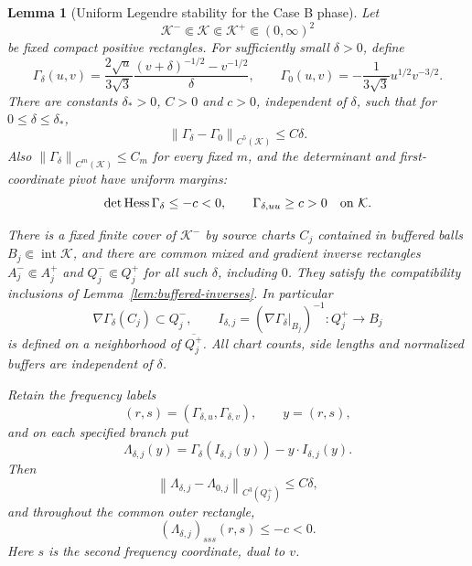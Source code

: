 \documentclass[11pt,a4paper]{article}
\numberwithin{equation}{section}
\newtheorem{lemma}[theorem]{Lemma}
\theoremstyle{remark}
\newcommand{\norm}[1]{\left\lVert #1\right\rVert}
\DeclareMathOperator{\Hess}{Hess}
\begin{document}
\begin{lemma}[Uniform Legendre stability for the Case B phase]
\label{lem:caseB-Legendre-stability}
Let
\[
 \mathcal K^-\Subset\mathcal K\Subset\mathcal K^+
 \Subset(0,\infty)^2
\]
be fixed compact positive rectangles. For sufficiently small $\delta>0$,
define
\begin{equation}\label{eq:caseB-stability-exact}
 \Gamma_\delta(u,v)
 =\frac{2\sqrt u}{3\sqrt3}
   \frac{(v+\delta)^{-1/2}-v^{-1/2}}{\delta},
 \qquad
 \Gamma_0(u,v)=-\frac1{3\sqrt3}u^{1/2}v^{-3/2}.
\end{equation}
There are constants $\delta_*>0$, $C>0$ and $c>0$, independent of
$\delta$, such that for $0\le\delta\le\delta_*$,
\begin{equation}\label{eq:caseB-stability-C5}
 \norm{\Gamma_\delta-\Gamma_0}_{C^5(\mathcal K)}\le C\delta.
\end{equation}
Also $\norm{\Gamma_\delta}_{C^m(\mathcal K)}\le C_m$ for every fixed
$m$, and the determinant and first-coordinate pivot have uniform margins:
\[
 \det\Hess\Gamma_\delta\le-c<0,\qquad
 \Gamma_{\delta,uu}\ge c>0
 \quad\hbox{on }\mathcal K.
\]

There is a fixed finite cover of $\mathcal K^-$ by source charts $C_j$
contained in buffered balls $B_j\Subset\operatorname{int}\mathcal K$,
and there are common mixed and gradient inverse rectangles
$A_j^-\Subset A_j^+$ and $Q_j^-\Subset Q_j^+$ for all such $\delta$,
including $0$. They satisfy the compatibility inclusions of
Lemma~\ref{lem:buffered-inverses}. In particular
\[
 \nabla\Gamma_\delta(C_j)\subset Q_j^-,\qquad
 I_{\delta,j}=(\nabla\Gamma_\delta|_{B_j})^{-1}:Q_j^+\longrightarrow B_j
\]
is defined on a neighborhood of $\overline{Q_j^+}$. All chart counts,
side lengths and normalized buffers are independent of $\delta$.

Retain the frequency labels
\begin{equation}\label{eq:caseB-stability-labels}
 (r,s)=(\Gamma_{\delta,u},\Gamma_{\delta,v}),
 \qquad y=(r,s),
\end{equation}
and on each specified branch put
\[
 \Lambda_{\delta,j}(y)
 =\Gamma_\delta(I_{\delta,j}(y))-y\cdot I_{\delta,j}(y).
\]
Then
\begin{equation}\label{eq:caseB-stability-C3}
 \norm{\Lambda_{\delta,j}-\Lambda_{0,j}}_{C^3(Q_j^+)}\le C\delta,
\end{equation}
and throughout the common outer rectangle,
\begin{equation}\label{eq:caseB-stability-third}
 (\Lambda_{\delta,j})_{sss}(r,s)\le-c<0.
\end{equation}
Here $s$ is the \emph{second} frequency coordinate, dual to $v$.


\end{lemma}
\end{document}
